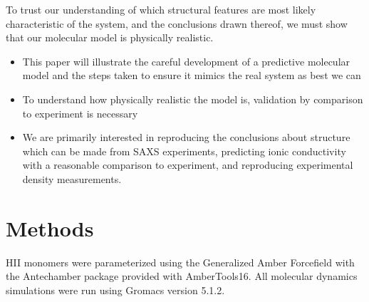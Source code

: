 \documentclass{article}
\begin{document}
	To trust our understanding of which structural features are most likely characteristic of the system, and the conclusions drawn thereof, we must show that our molecular model is physically realistic.   
	\begin{itemize}
		\item This paper will illustrate the careful development of a predictive molecular model and the steps taken to ensure it mimics the real system as best we can 
		\item To understand how physically realistic the model is, validation by comparison to experiment is necessary
		\item We are primarily interested in reproducing the conclusions about structure which can be made from SAXS experiments, predicting ionic conductivity with a reasonable comparison to experiment, and reproducing experimental density measurements.          
	\end{itemize}
	
	\section{Methods}
	
	HII monomers were parameterized using the Generalized Amber Forcefield with the Antechamber package provided with AmberTools16. All molecular dynamics simulations were run using Gromacs version 5.1.2.
\end{document}
